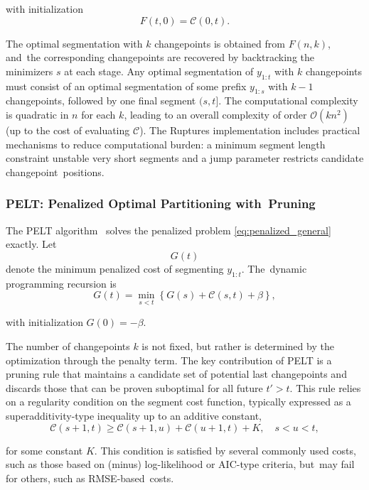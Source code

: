 \documentclass[mathematics,article,accept,pdftex,moreauthors]{Definitions/mdpi}
\begin{document}
with initialization
\[
F(t,0) = \mathcal{C}(0,t).
\]

The optimal segmentation with $k$ changepoints is obtained from $F(n,k)$, and~the corresponding changepoints are recovered by backtracking the minimizers $s$ at each stage.
Any optimal segmentation of $y_{1:t}$ with $k$ changepoints must consist of an optimal segmentation of some prefix $y_{1:s}$ with $k-1$ changepoints, followed by one final segment $(s,t]$.
The computational complexity is quadratic in $n$ for each $k$, leading to an overall complexity of order $\mathcal{O}(k n^2)$ (up to the cost of evaluating $\mathcal{C}$). 
The Ruptures implementation includes practical mechanisms to reduce computational burden: a minimum segment length constraint unstable very short segments and a jump parameter restricts candidate changepoint~positions.

\subsubsection{PELT: Penalized Optimal Partitioning with~Pruning}
The PELT algorithm~\cite{KFE12} solves the penalized problem \eqref{eq:penalized_general} exactly. 
Let
\[
G(t)
\]
denote the minimum penalized cost of segmenting $y_{1:t}$. The~dynamic programming recursion is
\begin{equation}
	\label{eq:PELT_recursion_consistent}
	G(t)
	=
	\min_{s < t}
	\left\{
	G(s)
	+
	\mathcal{C}(s,t)
	+
	\beta
	\right\},
\end{equation}

\noindent with initialization $G(0) = -\beta$.

The number of changepoints $k$ is not fixed, but rather is determined by the optimization through the penalty term.
The key contribution of PELT is a pruning rule that maintains a candidate set of potential last changepoints and discards those that can be proven suboptimal for all future $t' > t$. This rule relies on a regularity condition on the segment cost function, typically expressed as a superadditivity-type inequality up to an additive constant,
\begin{equation}
\mathcal{C}(s+1,t) \ge \mathcal{C}(s+1,u) + \mathcal{C}(u+1,t) + K, \quad s < u < t,
\end{equation}

\noindent for some constant $K$. This condition is satisfied by several commonly used costs, such as those based on (minus) log-likelihood or AIC-type criteria, but~may fail for others, such as RMSE-based~costs.
\end{document}
